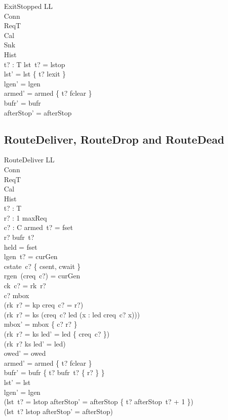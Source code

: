 \documentclass[a4paper,10pt,fleqn]{article}
\begin{document}
\begin{schema}{ExitStopped}
  \Delta LL \\
  \Xi Conn \\
  \Xi ReqT \\
  \Xi Cal \\
  \Xi Snk \\
  \Xi Hist \\
  t? : T
\where
  lst~t? = lstop \\
  lst' = lst \oplus \{ t? \mapsto lexit \} \\
  lgen' = lgen \\
  armed' = armed \oplus \{ t? \mapsto fclear \} \\
  bufr' = bufr \\
  afterStop' = afterStop
\end{schema}

\subsection{RouteDeliver, RouteDrop and RouteDead}

\begin{schema}{RouteDeliver}
  \Delta LL \\
  \Xi Conn \\
  \Xi ReqT \\
  \Xi Cal \\
  \Xi Hist \\
  t? : T \\
  r? : 1 \upto maxReq \\
  c? : C
\where
  armed~t? = fset \\
  r? \in bufr~t? \\
  held = fset \\
  lgen~t? = curGen \\
  cstate~c? \in \{ csent, cwait \} \\
  rgen~(creq~c?) = curGen \\
  ck~c? = rk~r? \\
  c? \notin \dom mbox \\
  (rk~r? = kp \implies creq~c? = r?) \\
  (rk~r? = ks \implies
    (creq~c? \in led \land (\forall x : led \spot creq~c? \leq x))) \\
  mbox' = mbox \cup \{ c? \mapsto r? \} \\
  (rk~r? = ks \implies led' = led \setminus \{ creq~c? \}) \\
  (rk~r? \neq ks \implies led' = led) \\
  owed' = owed \\
  armed' = armed \oplus \{ t? \mapsto fclear \} \\
  bufr' = bufr \oplus \{ t? \mapsto bufr~t? \setminus \{ r? \} \} \\
  lst' = lst \\
  lgen' = lgen \\
  (lst~t? = lstop \implies
    afterStop' = afterStop \oplus \{ t? \mapsto afterStop~t? + 1 \}) \\
  (lst~t? \neq lstop \implies afterStop' = afterStop)
\end{schema}
\end{document}
